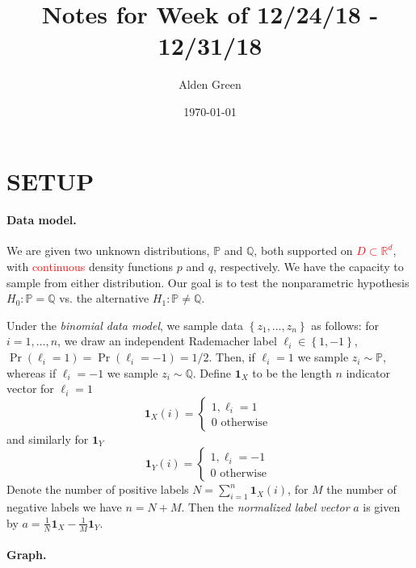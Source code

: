 \documentclass{article}
\newcommand{\Reals}{\mathbb{R}}
\newcommand{\set}[1]{\left\{#1\right\}}
\newcommand{\Rd}{\Reals^d}
\newcommand{\Pbb}{\mathbb{P}}
\newcommand{\Qbb}{\mathbb{Q}}
\newcommand{\1}{\mathbf{1}}
\theoremstyle{alden}
\theoremstyle{aldenthm}
\theoremstyle{remark}
\begin{document}
	
\title{Notes for Week of 12/24/18 - 12/31/18}
\author{Alden Green}
\date{\today}
\maketitle

\section{SETUP}
\paragraph{Data model.}

We are given two unknown distributions, $\Pbb$ and $\Qbb$, both supported on \textcolor{red}{$D \subset \Rd$}, with \textcolor{red}{continuous} density functions $p$ and $q$, respectively. We have the capacity to sample from either distribution. Our goal is to test the nonparametric hypothesis $H_0: \Pbb = \Qbb$ vs. the alternative $H_1: \Pbb \neq \Qbb$. 

Under the \emph{binomial data model}, we sample data $\set{z_1, \ldots, z_n}$ as follows: for $i = 1,\ldots,n$, we draw an independent Rademacher label $\ell_i \in \set{1, -1}$, $\Pr(\ell_i = 1) = \Pr(\ell_i = -1) = 1/2$. Then, if $\ell_i = 1$ we sample $z_i \sim \Pbb$, whereas if $\ell_i = -1$ we sample $z_i \sim \Qbb$. Define $\1_X$ to be the length $n$ indicator vector for $\ell_i = 1$
\begin{equation*}
\1_X(i) = 
\begin{cases}
1, \ell_i = 1\\
0 \text{ otherwise } 
\end{cases}
\end{equation*}
and similarly for $\1_Y$
\begin{equation*}
\1_Y(i) = 
\begin{cases}
1, \ell_i= -1 \\
0 \text{ otherwise } 
\end{cases}
\end{equation*}
Denote the number of positive labels $N = \sum_{i = 1}^{n} \1_X(i)$, for $M$ the number of negative labels we have $n = N + M$. Then the \emph{normalized label vector} $a$ is given by $a = \frac{1}{N}\1_X - \frac{1}{M}\1_Y$. 

\paragraph{Graph.}
\end{document}
